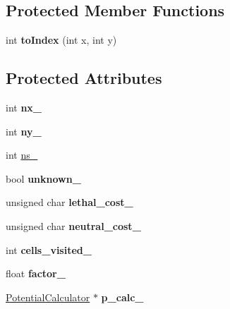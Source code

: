 \subsection*{Protected Member Functions}
\begin{DoxyCompactItemize}
\item 
\mbox{\label{classglobal__planner_1_1_expander_ab9ed0e500049774014960dfb68f1e50c}} 
int {\bfseries to\+Index} (int x, int y)
\end{DoxyCompactItemize}
\subsection*{Protected Attributes}
\begin{DoxyCompactItemize}
\item 
\mbox{\label{classglobal__planner_1_1_expander_a72bbafddd4f838603ebe42cf7fb57cbc}} 
int {\bfseries nx\+\_\+}
\item 
\mbox{\label{classglobal__planner_1_1_expander_a3d1877778a6ed03533dace263d0dbe7e}} 
int {\bfseries ny\+\_\+}
\item 
int \mbox{\hyperlink{classglobal__planner_1_1_expander_a0538b977e9cd0022810096b79e61e529}{ns\+\_\+}}
\item 
\mbox{\label{classglobal__planner_1_1_expander_abbb2fc0fd78f4ae3e8ffad2981629a91}} 
bool {\bfseries unknown\+\_\+}
\item 
\mbox{\label{classglobal__planner_1_1_expander_a044a34d5d5ddd41016afec643cb65d4e}} 
unsigned char {\bfseries lethal\+\_\+cost\+\_\+}
\item 
\mbox{\label{classglobal__planner_1_1_expander_aa8941c07a0f50a2e3ce3088f7ecb8e61}} 
unsigned char {\bfseries neutral\+\_\+cost\+\_\+}
\item 
\mbox{\label{classglobal__planner_1_1_expander_ad51bd3f97e8d1ca48c357175d723f3f4}} 
int {\bfseries cells\+\_\+visited\+\_\+}
\item 
\mbox{\label{classglobal__planner_1_1_expander_a999123a5d229a31933a64ba56a4f525d}} 
float {\bfseries factor\+\_\+}
\item 
\mbox{\label{classglobal__planner_1_1_expander_a3d991703be557e08056daedd3d872fff}} 
\mbox{\hyperlink{classglobal__planner_1_1_potential_calculator}{Potential\+Calculator}} $\ast$ {\bfseries p\+\_\+calc\+\_\+}
\end{DoxyCompactItemize}


